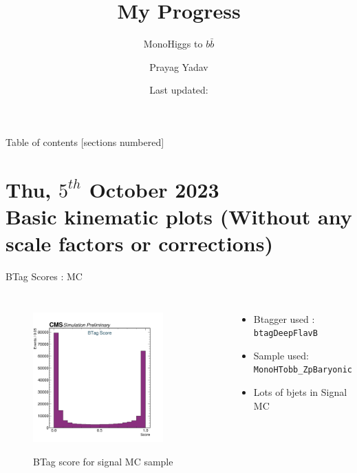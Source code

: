 \documentclass[10pt,xcolor=dvipsnames,aspectratio=169]{beamer}
\title{My Progress}
\subtitle{MonoHiggs to $b \bar{b}$}
\author{Prayag Yadav}
\institute{University of Hyderabad}
\date{Last updated: \DTMnow{}}
\begin{document}
  \maketitle

  \begin{frame}{Table of contents}
    [sections numbered]
    \tableofcontents%
  \end{frame}


  \section[Basic kinematic plots ]{\small{Thu, $5^{th}$ October 2023 } \\ Basic kinematic plots \tiny{(Without any scale factors or corrections)} }


    \begin{frame}[fragile]{BTag Scores : MC} 
      \begin{columns}
        \begin{figure} 
          \centering 
          \includegraphics[width=0.8\textwidth]{../Archive/KinemPlots/TagMC.png }
          \label{TagMC} 
          \caption{BTag score for signal MC sample}
        \end{figure} 
        \begin{itemize} 
          \raggedright 
          \small
          \item {Btagger used : \texttt{btagDeepFlavB}} 
          \item {Sample used: \texttt{MonoHTobb\_ZpBaryonic}} 
          \item Lots of bjets in Signal MC 
        \end{itemize}
      \end{columns} 
    \end{frame} 
    
\end{document}
